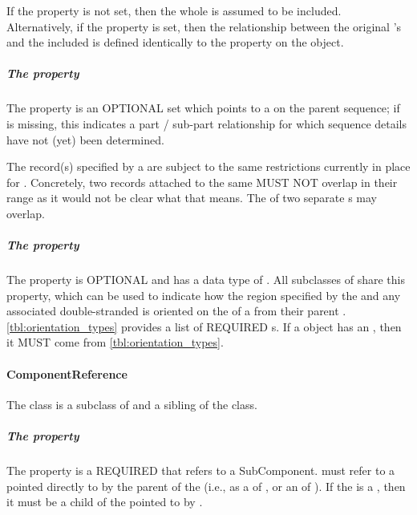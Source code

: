 If the  property is not set, then the whole  is assumed to be included. Alternatively,
if the  property is set, then the relationship between the original 's
 and the included  is defined identically to the 
property on the  object.


\subparagraph{The  property}\label{sec:location}
The  property is an OPTIONAL set which points to a  on the parent  sequence; if  is missing, this indicates a part / sub-part relationship for which sequence details have not (yet) been determined.

The  record(s) specified by a  are subject to the same restrictions currently in place for  . Concretely, two  records attached to the same  MUST NOT overlap in their range as it would not be clear what that means. The  of two separate s may overlap.

\subparagraph{The  property}\label{sec:orientation2}
The  property is OPTIONAL and has a data type of . All subclasses of  share this property, which can be used to indicate how the region specified by the  and any associated double-stranded  is oriented on the  of a   from their parent . \ref{tbl:orientation_types} provides a list of REQUIRED  s. If a  object has an , then it MUST come from \ref{tbl:orientation_types}.



\paragraph{ComponentReference}
\label{sec:ComponentReference}

The  class is a subclass of  and a sibling of the  class. 


\subparagraph{The  property}\label{sec:inChildOf}

The  property is a REQUIRED  that refers to a SubComponent.  must refer to a  pointed directly to by the parent of the  (i.e., as a  of , or an  of ). If the  is a , then it must be a child of the  pointed to by .

